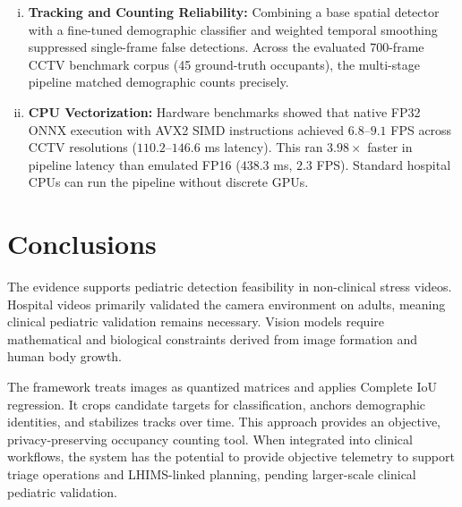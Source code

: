 \begin{enumerate}[(i)]
    \item \textbf{Tracking and Counting Reliability:} Combining a base spatial detector with a fine-tuned demographic classifier and weighted temporal smoothing suppressed single-frame false detections. Across the evaluated 700-frame CCTV benchmark corpus (45 ground-truth occupants), the multi-stage pipeline matched demographic counts precisely.
    \item \textbf{CPU Vectorization:} Hardware benchmarks showed that native FP32 ONNX execution with AVX2 SIMD instructions achieved $6.8\text{--}9.1$ FPS across CCTV resolutions ($110.2\text{--}146.6$ ms latency). This ran $3.98\times$ faster in pipeline latency than emulated FP16 ($438.3$ ms, $2.3$ FPS). Standard hospital CPUs can run the pipeline without discrete GPUs.
\end{enumerate}

\section{Conclusions}
The evidence supports pediatric detection feasibility in non-clinical stress videos. Hospital videos primarily validated the camera environment on adults, meaning clinical pediatric validation remains necessary. Vision models require mathematical and biological constraints derived from image formation and human body growth.

The framework treats images as quantized matrices and applies Complete IoU regression. It crops candidate targets for classification, anchors demographic identities, and stabilizes tracks over time. This approach provides an objective, privacy-preserving occupancy counting tool. When integrated into clinical workflows, the system has the potential to provide objective telemetry to support triage operations and LHIMS-linked planning, pending larger-scale clinical pediatric validation.

